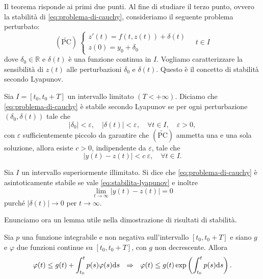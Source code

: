 Il teorema risponde ai primi due punti. Al fine di studiare il terzo punto, ovvero la stabilità di \eqref{eq:problema-di-cauchy}, consideriamo il seguente problema perturbato:
\begin{equation*}
(\widetilde{\text{PC}}) \ \begin{cases}
z'(t) =f( t,z(t)) +\delta (t)\\
z(0) =y_{0} +\delta _{0}
\end{cases} \quad t\in I
\end{equation*}
dove $\delta _{0} \in \mathbb{R}$ e $\delta (t)$ è una funzione continua in $I$. Vogliamo caratterizzare la sensibilità di $z(t)$ alle perturbazioni $\delta _{0}$ e $\delta (t)$. Questo è il concetto di stabilità secondo Lyapunov.

\begin{definition}
Sia $I=[ t_{0} ,t_{0} +T]$ un intervallo limitato $( T< +\infty )$.
Diciamo che \eqref{eq:problema-di-cauchy} è stabile secondo Lyapunov se per ogni perturbazione $( \delta _{0} ,\delta (t))$ tale che
\begin{equation*}
| \delta _{0}| < \varepsilon ,\quad | \delta (t)| < \varepsilon ,\quad \forall t\in I,\quad \varepsilon  >0,
\end{equation*}
con $\varepsilon $ sufficientemente piccolo da garantire che $(\widetilde{\text{PC}})$ ammetta una e una sola soluzione, allora esiste $c >0$, indipendente da $\varepsilon $, tale che
\begin{equation}
| y(t) -z(t)| < c\ \varepsilon ,\quad \forall t\in I.
\label{eq:stabilita-lyapunov}
\end{equation}
\end{definition}

\begin{definition}
Sia $I$ un intervallo superiormente illimitato.
Si dice che \eqref{eq:problema-di-cauchy} è asintoticamente stabile se vale \eqref{eq:stabilita-lyapunov} e inoltre
\begin{equation*}
\lim _{t\rightarrow \infty }| y(t) -z(t)| =0
\end{equation*}
purché $| \delta (t)| \rightarrow 0$ per $t\rightarrow \infty $.
\end{definition}

Enunciamo ora un lemma utile nella dimostrazione di risultati di stabilità.
\begin{lemma}
[Gronwall]
Sia $p$ una funzione integrabile e non negativa sull'intervallo $[ t_{0} ,t_{0} +T]$ e siano $g$ e $\varphi $ due funzioni continue su $[ t_{0} ,t_{0} +T]$, con $g$ non decrescente. Allora
\begin{equation*}
\varphi (t) \leqslant g(t) +\int\nolimits ^{t}_{t_{0}} p(s) \varphi (s) \ds \ \ \Rightarrow \ \ \varphi (t) \leqslant g(t)\exp\left(\int\nolimits ^{t}_{t_{0}} p(s) \ds\right).
\end{equation*}
\end{lemma}

